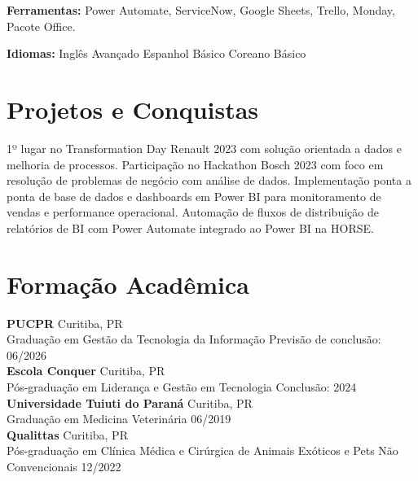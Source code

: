 \documentclass[11pt,a4paper]{article}
\begin{document}
\textbf{Ferramentas:} Power Automate, ServiceNow, Google Sheets, Trello, Monday, Pacote Office.

\textbf{Idiomas:} Inglês Avançado \enspace\textbullet\enspace Espanhol Básico \enspace\textbullet\enspace Coreano Básico

\section{Projetos e Conquistas}

1º lugar no Transformation Day Renault 2023 com solução orientada a dados e melhoria de processos. Participação no Hackathon Bosch 2023 com foco em resolução de problemas de negócio com análise de dados. Implementação ponta a ponta de base de dados e dashboards em Power BI para monitoramento de vendas e performance operacional. Automação de fluxos de distribuição de relatórios de BI com Power Automate integrado ao Power BI na HORSE.

\section{Formação Acadêmica}

\textbf{PUCPR} \hfill Curitiba, PR\\
Graduação em Gestão da Tecnologia da Informação \hfill Previsão de conclusão: 06/2026\\[6pt]

\textbf{Escola Conquer} \hfill Curitiba, PR\\
Pós-graduação em Liderança e Gestão em Tecnologia \hfill Conclusão: 2024\\[6pt]

\textbf{Universidade Tuiuti do Paraná} \hfill Curitiba, PR\\
Graduação em Medicina Veterinária \hfill 06/2019\\[6pt]

\textbf{Qualittas} \hfill Curitiba, PR\\
Pós-graduação em Clínica Médica e Cirúrgica de Animais Exóticos e Pets Não Convencionais \hfill 12/2022
\end{document}
